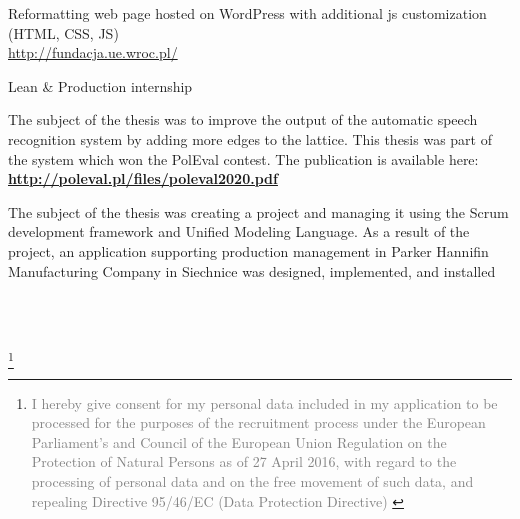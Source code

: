 \documentclass[10pt,a4paper,ragged2e,withhyper, normalphoto]{altacv}
\newcommand\blfootnote[1]{%
  \begingroup
  \renewcommand\thefootnote{}\footnote{#1}%
  \addtocounter{footnote}{-1}%
  \endgroup
}
\begin{document}
\begin{paracol}{2}
    \divider

    
    Reformatting web page hosted on WordPress with additional js customization (HTML, CSS, JS) \\ \url{http://fundacja.ue.wroc.pl/}
    
    \divider
    
    Lean \& Production internship 
    
    \divider



The subject of the thesis was to improve the output of the automatic speech recognition system by adding more edges to the lattice. This thesis was part of the system which won the PolEval contest. The publication is available here:
\\ \textcolor{PastelRed}{\textbf{\url{http://poleval.pl/files/poleval2020.pdf}}}

\medskip

The subject of the thesis was creating a project and managing it using the Scrum development framework and Unified Modeling Language.
As a result of the project, an application supporting production management in Parker Hannifin Manufacturing Company in Siechnice was designed, implemented, and installed
\medskip


\\
 \\


\blfootnote{\textcolor{gray}{
I hereby give consent for my personal data included in my application to be processed for the purposes of the recruitment process under the European Parliament's and Council of the European Union Regulation on the Protection of Natural Persons as of 27 April 2016, with regard to the processing of personal data and on the free movement of such data, and repealing Directive 95/46/EC (Data Protection Directive)
}}



\end{paracol}
\end{document}
